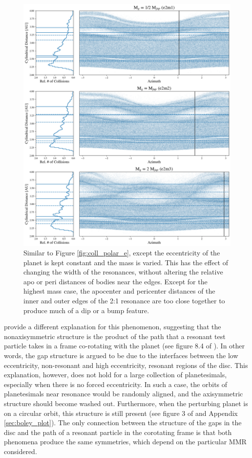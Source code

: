\begin{figure}
    \includegraphics[width=\textwidth]{figures/grind/coll_polar_m.png}
    \caption{Similar to Figure \ref{fig:coll_polar_e}, except the eccentricity of the planet is kept constant and the mass is varied.
    This has the effect of changing the width of the resonances, without altering the relative apo or peri distances of bodies near 
    the edges. Except for the highest mass case, the apocenter and pericenter distances of the inner and outer edges of the 2:1 
    resonance are too close together to produce much of a dip or a bump feature.\label{fig:coll_polar_m}}
\end{figure}

\cite{tabeshian16} provide a different explanation for this phenomenon, suggesting that the nonaxisymmetric structure is the 
product of the path that a resonant test particle takes in a frame co-rotating with the planet (see figure 8.4 of \cite{murray99}). In 
other words, the gap structure is argued to be due to the interfaces between the low eccentricity, non-resonant and high 
eccentricity, resonant regions of the disc. This explanation, however, does not hold for a large collection of planetesimals, 
especially when there is no forced eccentricity. In such a case, the orbits of planetesimals near resonance would be randomly 
aligned, and the axisymmetric structure should become washed out. Furthermore, when the perturbing planet is on a circular 
orbit, this structure is still present (see figure 3 of \cite{tabeshian16} and Appendix \ref{sec:boley_plot}). The only connection 
between the structure of the gaps in the disc and the path of a resonant particle in the corotating frame is that both phenomena 
produce the same symmetries, which depend on the particular MMR considered.

